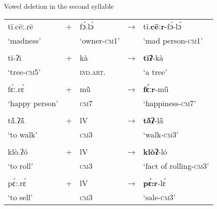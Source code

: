 \documentclass[output=paper]{langscibook}
\begin{document}
 \begin{exe}
    \ex Vowel deletion in the second syllable \label{ex:traore:vowelDeletionSecondSyllable:21}\\
    \begin{tabularx}{.8\textwidth}{l l l l l}
        tī.cēː.rē   &   +   &   fɔ́.lɔ́                  &   →       & tī.\textbf{cēːr}{}-fɔ́-lɔ́  \\
        `madness'   &   {}  &   `owner-\textsc{cm1}'    &   {}      & {`mad person-\textsc{cm}1'}\\
                    &       &                           &           &                           \\
        tī-ʔī       &   +   &  kà                       &   →       &  \textbf{tīʔ}{}-kà \\
        `tree-\textsc{cm}5' & {} & \textsc{ind.art}.    &   {}      &  {`a tree'}\\
                            &       &                           &           &               \\
        fɛ́ː.rɛ́       &    + &     mũ̀                    &   →       & \textbf{fɛ́ːr}-mũ̄ \\
        {`happy person'} & {} & \textsc{cm}7            &   {}      & `happiness-\textsc{cm}7'\\
                                             &       &                           &           &               \\
       tã́.ʔã́  &  +  & lV                        &  →        & \textbf{tã́ʔ}-lã̄  \\
        `to walk'       &   & \textsc{cm}3              &           & `walk-\textsc{cm3}'\\
                                             &       &                           &           &               \\
        klò.ʔó       &   +  & lV                        &  →        & \textbf{klòʔ}{}-ló\\
        ‘to roll’   &       &  \textsc{cm}3             &           & `fact of rolling-\textsc{cm}3'\\
                                             &       &                           &           &               \\
        pɛ́:.rɛ́    &  +    & lV                        &   →       & \textbf{pɛ́:r}{}-lɛ́   \\
        `to sell'   &       & \textsc{cm}3              &           &  `sale-\textsc{cm3}'\\
    \end{tabularx}
 \end{exe}
\end{document}
